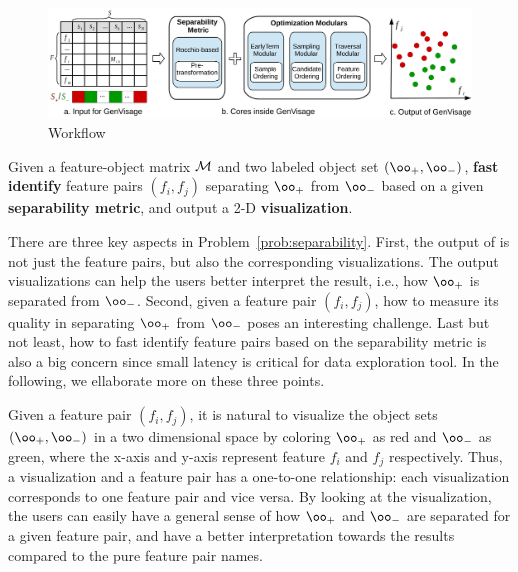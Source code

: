 
\begin{figure}[t]
	\centering
	\includegraphics[width=0.9\linewidth]{fig/workflow2.pdf}
\caption{\genviz Workflow}
\label{fig:workflow}
\end{figure} 



\begin{formulation}[Separability]\label{prob:separability}
Given a feature-object matrix $\mm$ and two labeled object set $(\oo_+,\oo_-)$, \textbf{fast identify} \topk feature pairs $(f_i,f_j)$ separating $\oo_+$ from $\oo_-$ based on a given \textbf{separability metric}, and output a 2-D \textbf{visualization}.
\end{formulation}
There are three key aspects in Problem~\ref{prob:separability}. First, the output of \genviz is not just the \topk feature pairs, but also the corresponding visualizations. The output visualizations can help the users better interpret the result, i.e., how $\oo_+$ is separated from $\oo_-$. Second, given a feature pair $(f_i,f_j)$, how to measure its quality in separating $\oo_+$ from $\oo_-$ poses an interesting challenge. Last but not least, how to fast identify \topk feature pairs based on the separability metric is also a big concern since small latency is critical for data exploration tool. In the following, we ellaborate more on these three points.

 Given a feature pair $(f_i,f_j)$, it is natural to visualize the object sets $(\oo_+,\oo_-)$ in a two dimensional space by coloring $\oo_+$ as red and $\oo_-$ as green, where the x-axis and y-axis represent feature $f_i$ and $f_j$ respectively. Thus, a visualization and a feature pair has a one-to-one relationship: each visualization corresponds to one feature pair and vice versa. By looking at the visualization, the users can easily have a general sense of how $\oo_+$ and $\oo_-$ are separated for a given feature pair, and have a better interpretation towards the results compared to the pure feature pair names.


